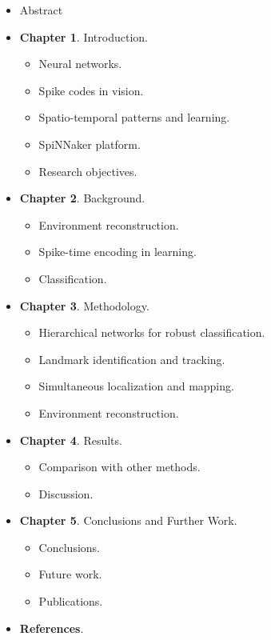   \begin{itemize}
      \item Abstract
      \item \textbf{Chapter 1}. Introduction.
      \begin{itemize}
        \item Neural networks.
        \item Spike codes in vision.
        \item Spatio-temporal patterns and learning.
        \item SpiNNaker platform.
        \item Research objectives.
      \end{itemize}
      \item \textbf{Chapter 2}. Background.
      \begin{itemize}
        \item Environment reconstruction.
        \item Spike-time encoding in learning.
        \item Classification.
      \end{itemize}
      \item \textbf{Chapter 3}. Methodology.
      \begin{itemize}
      \item Hierarchical networks for robust classification.
      \item Landmark identification and tracking.
      \item Simultaneous localization and mapping.
      \item Environment reconstruction.
      \end{itemize}
      \item \textbf{Chapter 4}. Results.
      \begin{itemize}
        \item Comparison with other methods.
        \item Discussion.
      \end{itemize}
      \item \textbf{Chapter 5}. Conclusions and Further Work.
      \begin{itemize}
        \item Conclusions.
        \item Future work.
        \item Publications.
      \end{itemize}
      \item \textbf{References}.
      
  \end{itemize}
